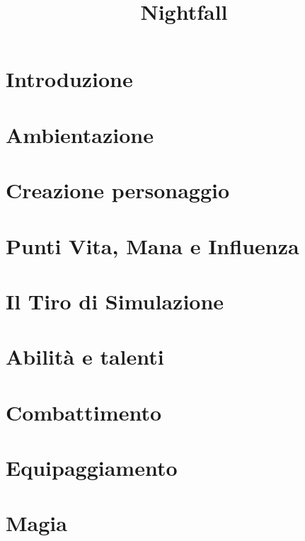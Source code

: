 \documentclass[10pt]{article} %
\title{Nightfall}
\author{}
\date{} %
\begin{document}
 \maketitle

\tableofcontents{}
\cleardoublepage

\section{Introduzione}

\clearpage

\section{Ambientazione}

\clearpage

\section{Creazione personaggio}

\clearpage

\section{Punti Vita, Mana e Influenza}

\clearpage


\section{Il Tiro di Simulazione}

\clearpage 

\section{Abilità e talenti}

\clearpage 





\section{Combattimento}

\clearpage 

\section{Equipaggiamento}

\clearpage 

\section{Magia}

\clearpage 
\end{document}

